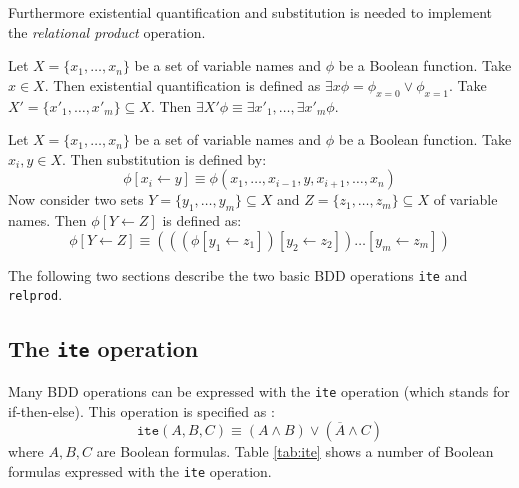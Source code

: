 Furthermore existential quantification and substitution is needed to implement the \emph{relational product} operation.

\begin{definition}
	Let $X = \{ x_1, \dots, x_n \}$ be a set of variable names and $\phi$ be a Boolean function. Take $x \in X$. Then existential quantification is defined as $\exists x \phi = \phi_{x=0} \vee \phi_{x=1}$. Take $X' = \{ x'_1, \dots, x'_m \} \subseteq X$. Then $\exists X' \phi \equiv \exists x'_1, \dots, \exists x'_m \phi$.
\end{definition}

\begin{definition}[Substitution]
	Let $X = \{ x_1, \dots, x_n \}$ be a set of variable names and $\phi$ be a Boolean function. Take $x_i, y \in X$. Then substitution is defined by:
	\begin{equation}
		\phi[x_i \gets y] \equiv \phi(x_1, \dots, x_{i - 1}, y, x_{i + 1}, \dots, x_n)
	\end{equation}
	Now consider two sets $Y = \{ y_1, \dots, y_m \} \subseteq X$ and $Z = \{ z_1, \dots, z_m \} \subseteq X$ of variable names. Then $\phi[Y \gets Z]$ is defined as:
	\begin{equation}
		\phi[Y \gets Z] \equiv (((\phi[y_1 \gets z_1])[y_2 \gets z_2]) \dots [y_m \gets z_m])
	\end{equation}
\end{definition}

The following two sections describe the two basic BDD operations \texttt{ite} and \texttt{relprod}.

\subsection{The \texttt{ite} operation}
Many BDD operations can be expressed with the \texttt{ite} operation (which stands for if-then-else). This operation is specified as \cite{dijk2012parallelization}:
\begin{equation}
	\texttt{ite}(A, B, C) \equiv (A \wedge B) \vee (\overline A \wedge C)
\end{equation}
where $A, B, C$ are Boolean formulas. Table \ref{tab:ite} shows a number of Boolean formulas expressed with the \texttt{ite} operation.

